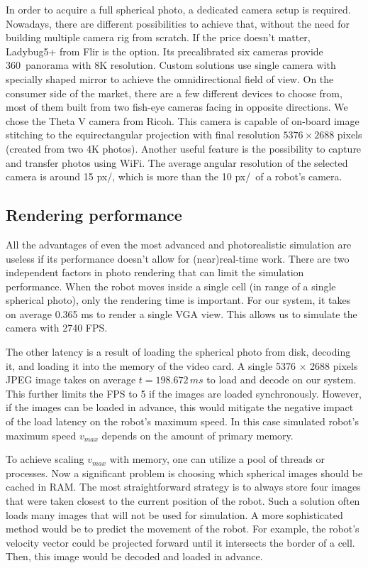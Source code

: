 \documentclass{svproc}
\begin{document}
In order to acquire a full spherical photo, a dedicated camera setup is required. Nowadays, there are different 
possibilities to achieve that, without the need for building multiple camera rig from scratch. If the price 
doesn't matter, Ladybug5+ from Flir is the option. Its precalibrated six cameras provide 360\textdegree\ 
panorama with 8K resolution. Custom solutions use single camera with specially shaped mirror \cite{wkasik2017embedded}
to achieve the omnidirectional field of view. On the consumer side of the market, there are a few different devices to choose from,
most of them built from two fish-eye cameras facing in opposite directions. We chose the Theta V camera from Ricoh. 
This camera is capable of on-board image stitching to the equirectangular projection with final resolution
$5376\times2688$ pixels (created from two 4K photos). Another useful feature is the possibility to capture
and transfer photos using WiFi. The average angular resolution of the selected camera is around 15 px/\textdegree, 
which is more than the 10 px/\textdegree\ of a robot's camera. 

\subsection{Rendering performance}

All the advantages of even the most advanced and photorealistic simulation are useless if its performance 
doesn't allow for (near)real-time work. There are two independent factors in photo rendering that can limit
the simulation performance. When the robot moves inside a single cell (in range of a single spherical
photo), only the rendering time is important. For our system, it takes on average 0.365 ms to
render a single VGA view. This allows us to simulate the camera with 2740 FPS. 

The other latency is a result of loading the spherical photo from disk, decoding it, and loading it into the memory of the video card.
A single 5376 $\times$ 2688 pixels JPEG image takes on average $t = 198.672\,ms$ to load and decode on our system.
This further limits the FPS to 5 if the images are loaded synchronously.
However, if the images can be loaded in advance, this would mitigate the negative impact of the load latency on the robot's maximum speed.
In this case simulated robot's maximum speed $v_{max}$ depends on the amount of primary memory.

To achieve scaling $v_{max}$ with memory, one can utilize a pool of threads or processes.
Now a significant problem is choosing which spherical images should be cached in RAM.
The most straightforward strategy is to always store four images that were taken closest to the current position of the robot.
Such a solution often loads many images that will not be used for simulation.
A more sophisticated method would be to predict the movement of the robot.
For example, the robot's velocity vector could be projected forward until it intersects the border of a cell.
Then, this image would be decoded and loaded in advance.
\end{document}
